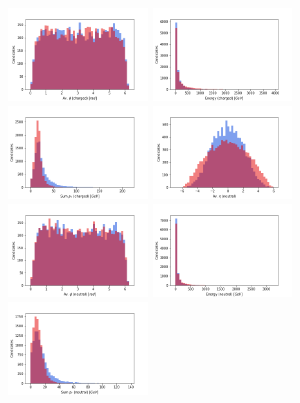 \documentclass[final,5p,times,twocolumn]{elsarticle}
\begin{document}
\begin{figure}[t]
\includegraphics[width=0.33\textwidth]{input_gpd_hAvPhi.png}
\includegraphics[width=0.33\textwidth]{input_gpd_hEnergy.png}
\includegraphics[width=0.33\textwidth]{input_gpd_hSumPT.png}
\includegraphics[width=0.33\textwidth]{input_gpd_nAvEta.png}
\includegraphics[width=0.33\textwidth]{input_gpd_nAvPhi.png}
\includegraphics[width=0.33\textwidth]{input_gpd_nEnergy.png}
\includegraphics[width=0.33\textwidth]{input_gpd_nSumPT.png}

\end{figure}
\end{document}
